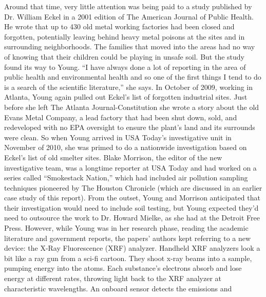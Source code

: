 Around that time, very little attention was being paid to a study published
by Dr. William Eckel in a 2001 edition of The American Journal of Public
Health. He wrote that up to 430 old metal working factories had been closed
and forgotten, potentially leaving behind heavy metal poisons at the sites
and in surrounding neighborhoods. The families that moved into the areas
had no way of knowing that their children could be playing in unsafe soil.
But the study found its way to Young. ``I have always done a lot of reporting
in the area of public health and environmental health and so one of the first
things I tend to do is a search of the scientific literature,'' she says.
In October of 2009, working in Atlanta, Young again pulled out Eckel's list
of forgotten industrial sites. Just before she left The Atlanta Journal-Constitution
she wrote a story about the old Evans Metal Company, a lead factory
that had been shut down, sold, and redeveloped with no EPA oversight to
ensure the plant's land and its surrounds were clean.
So when Young arrived in USA Today's investigative unit in November of
2010, she was primed to do a nationwide investigation based on Eckel's
list of old smelter sites. Blake Morrison, the editor of the new investigative
team, was a longtime reporter at USA Today and had worked on a series
called ``Smokestack Nation,'' which had included air pollution sampling
techniques pioneered by The Houston Chronicle (which are discussed in an
earlier case study of this report).
From the outset, Young and Morrison anticipated that their investigation
would need to include soil testing, but Young expected they'd need to outsource
the work to Dr. Howard Mielke, as she had at the Detroit Free Press.
However, while Young was in her research phase, reading the academic literature
and government reports, the papers' authors kept referring to a new
device: the X-Ray Fluorescence (XRF) analyzer. Handheld XRF analyzers
look a bit like a ray gun from a sci-fi cartoon. They shoot x-ray beams into a
sample, pumping energy into the atoms. Each substance's electrons absorb
and lose energy at different rates, throwing light back to the XRF analyzer
at characteristic wavelengths. An onboard sensor detects the emissions and

